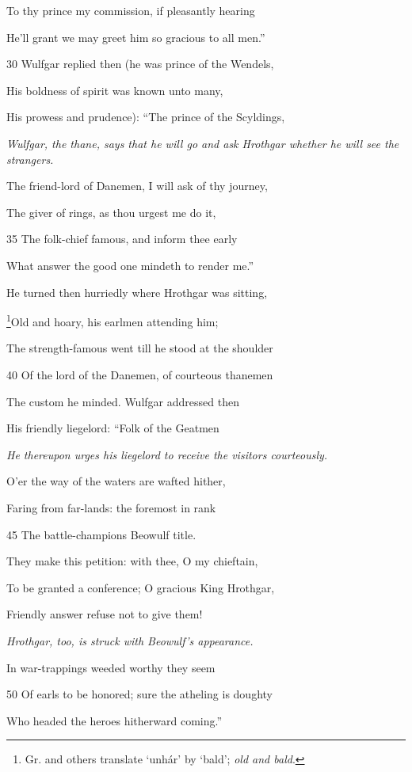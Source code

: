 To thy prince my commission, if pleasantly hearing

He’ll grant we may greet him so gracious to all men.”

30
Wulfgar replied then (he was prince of the Wendels,

His boldness of spirit was known unto many,

His prowess and prudence): “The prince of the Scyldings,

\emph{Wulfgar, the
thane, says that
he will go and ask
Hrothgar whether
he will see the
strangers.}

The friend-lord of Danemen, I will ask of thy journey,

The giver of rings, as thou urgest me do it,

35
The folk-chief famous, and inform thee early

What answer the good one mindeth to render me.”

He turned then hurriedly where Hrothgar was sitting,

\footnote{Gr. and others translate ‘unhár’ by ‘bald’; \emph{old and bald}.}Old and hoary, his earlmen attending him;

The strength-famous went till he stood at the shoulder

40
Of the lord of the Danemen, of courteous thanemen

The custom he minded. Wulfgar addressed then

His friendly liegelord: “Folk of the Geatmen

\emph{He thereupon
urges his liegelord
to receive the visitors
courteously.}

O’er the way of the waters are wafted hither,

Faring from far-lands: the foremost in rank

45
The battle-champions Beowulf title.

They make this petition: with thee, O my chieftain,

To be granted a conference; O gracious King Hrothgar,

Friendly answer refuse not to give them!

\emph{Hrothgar, too, is
struck with Beowulf’s
appearance.}

In war-trappings weeded worthy they seem

50
Of earls to be honored; sure the atheling is doughty

Who headed the heroes hitherward coming.”


